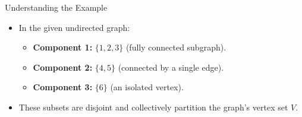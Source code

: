 \begin{remarks}[]{Understanding the Example}
    \begin{itemize}
        \item In the given undirected graph:
              \begin{itemize}
                  \item \textbf{Component 1:} $\{1, 2, 3\}$ (fully connected subgraph).
                  \item \textbf{Component 2:} $\{4, 5\}$ (connected by a single edge).
                  \item \textbf{Component 3:} $\{6\}$ (an isolated vertex).
              \end{itemize}
        \item These subsets are disjoint and collectively partition the graph's vertex set $V$.
    \end{itemize}
\end{remarks}
